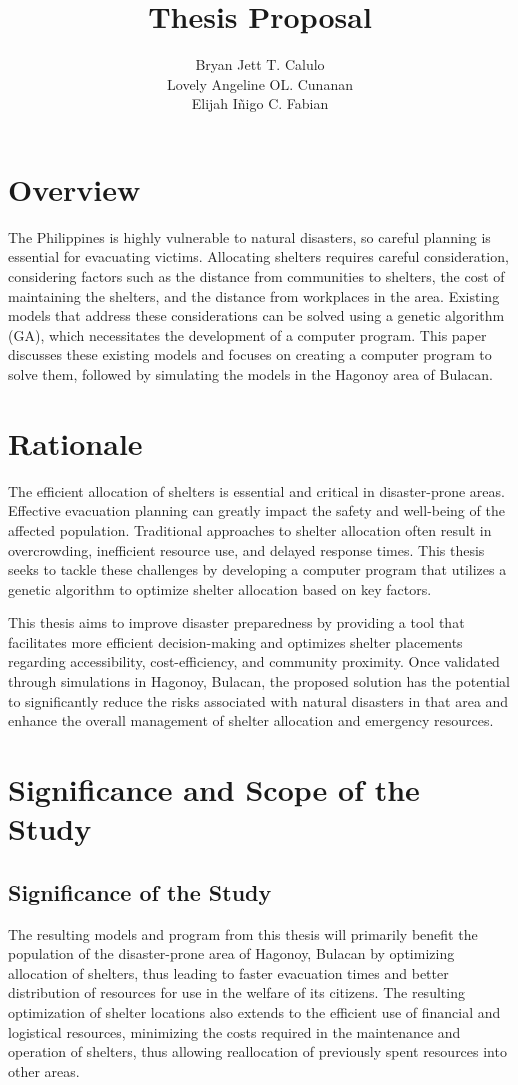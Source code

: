 \documentclass[english,12pt,a4paper]{article}
\title{\vspace{-12ex} \textbf{Thesis Proposal} }
\author{%
	Bryan Jett T. Calulo \\
	Lovely Angeline OL. Cunanan \\
	Elijah Iñigo C. Fabian
}
\begin{document}
	\maketitle
	
	\section*{Overview}
	The Philippines is highly vulnerable to natural disasters, so careful planning is essential for evacuating victims. Allocating shelters requires careful consideration, considering factors such as the distance from communities to shelters, the cost of maintaining the shelters, and the distance from workplaces in the area. Existing models that address these considerations can be solved using a genetic algorithm (GA), which necessitates the development of a computer program. This paper discusses these existing models and focuses on creating a computer program to solve them, followed by simulating the models in the Hagonoy area of Bulacan.
	
	\section*{Rationale}
	The efficient allocation of shelters is essential and critical in disaster-prone areas. Effective evacuation planning can greatly impact the safety and well-being of the affected population. Traditional approaches to shelter allocation often result in overcrowding, inefficient resource use, and delayed response times. This thesis seeks to tackle these challenges by developing a computer program that utilizes a genetic algorithm to optimize shelter allocation based on key factors.
	
	
	This thesis aims to improve disaster preparedness by providing a tool that facilitates more efficient decision-making and optimizes shelter placements regarding accessibility, cost-efficiency, and community proximity. Once validated through simulations in Hagonoy, Bulacan, the proposed solution has the potential to significantly reduce the risks associated with natural disasters in that area and enhance the overall management of shelter allocation and emergency resources.
	
	\section*{Significance and Scope of the Study}
		\subsection*{Significance of the Study}
			The resulting models and program from this thesis will primarily benefit the population of the disaster-prone area of Hagonoy, Bulacan by optimizing allocation of shelters, thus leading to faster evacuation times and better distribution of resources for use in the welfare of its citizens. The resulting optimization of shelter locations also extends to the efficient use of financial and logistical resources, minimizing the costs required in the maintenance and operation of shelters, thus allowing reallocation of previously spent resources into other areas.
\end{document}
